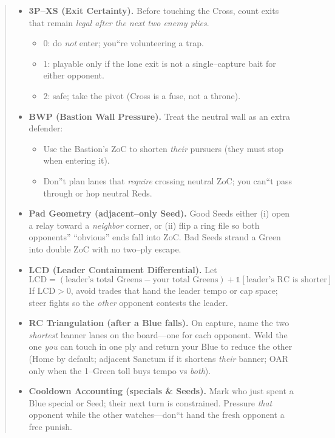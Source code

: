 \documentclass[11pt]{article}
\begin{document}
\begin{quote}
\begin{itemize}[leftmargin=1.3em,itemsep=0.35em]
  \item \textbf{3P--XS (Exit Certainty).} Before touching the Cross, count exits that remain \emph{legal after the next two enemy plies}.
  \begin{itemize}[itemsep=0.2em]
    \item 0: do \emph{not} enter; you``re volunteering a trap.
    \item 1: playable only if the lone exit is not a single--capture bait for either opponent.
    \item 2: safe; take the pivot (Cross is a fuse, not a throne).
  \end{itemize}

  \item \textbf{BWP (Bastion Wall Pressure).} Treat the neutral wall as an extra defender:
  \begin{itemize}[itemsep=0.2em]
    \item Use the Bastion's ZoC to shorten \emph{their} pursuers (they must stop when entering it).
    \item Don''t plan lanes that \emph{require} crossing neutral ZoC; you can``t pass through or hop neutral Reds.
  \end{itemize}

  \item \textbf{Pad Geometry (adjacent--only Seed).} Good Seeds either (i) open a relay toward a \emph{neighbor} corner, or (ii) flip a ring file so both opponents'' ``obvious'' ends fall into ZoC. Bad Seeds strand a Green into double ZoC with no two--ply escape.

  \item \textbf{LCD (Leader Containment Differential).} Let
  \[
    \mathrm{LCD} = (\text{leader's total Greens} - \text{your total Greens}) + \mathbb{1}[\text{leader's RC is shorter}]
  \]
  If $\mathrm{LCD}>0$, avoid trades that hand the leader tempo or cap space; steer fights so the \emph{other} opponent contests the leader.

  \item \textbf{RC Triangulation (after a Blue falls).} On capture, name the two \emph{shortest} banner lanes on the board---one for each opponent. Weld the one \emph{you} can touch in one ply and return your Blue to reduce the other (Home by default; adjacent Sanctum if it shortens \emph{their} banner; OAR only when the 1--Green toll buys tempo vs \emph{both}).

  \item \textbf{Cooldown Accounting (specials \& Seeds).} Mark who just spent a Blue special or Seed; their next turn is constrained. Pressure \emph{that} opponent while the other watches---don``t hand the fresh opponent a free punish.


\end{itemize}
\end{quote}
\end{document}
